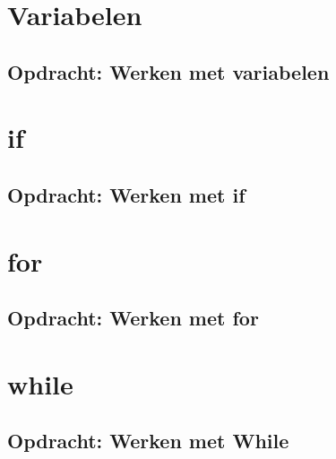 \documentclass[a4paper,12pt,twoside,openright,titlepage]{book}
\begin{document}
\section{Variabelen}



\subsection{Opdracht: Werken met variabelen}

\section{if}

\subsection{Opdracht: Werken met if}

\section{for}

\subsection{Opdracht: Werken met for}

\section{while}

\subsection{Opdracht: Werken met While}


\printindex
\end{document}
